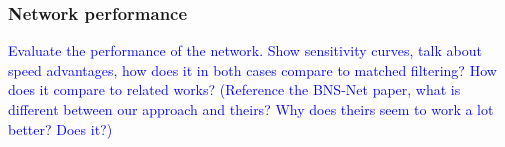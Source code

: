 \subsubsection{Network performance}
\textcolor{blue}{Evaluate the performance of the network. Show sensitivity curves, talk about speed advantages, how does it in both cases compare to matched filtering? How does it compare to related works? (Reference the BNS-Net paper, what is different between our approach and theirs? Why does theirs seem to work a lot better? Does it?)}
